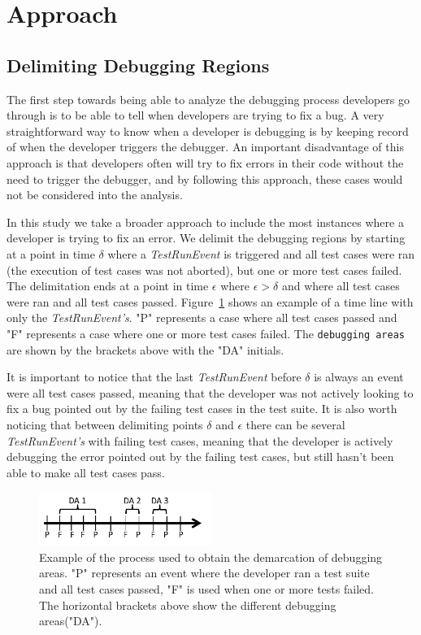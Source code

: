 \documentclass[sigconf]{acmart}
\begin{document}
\section{Approach}
\subsection{Delimiting Debugging Regions}
The first step towards being able to analyze the debugging
process developers go through is to be able to tell when
developers are trying to fix a bug. A very straightforward 
way to know when a developer is debugging is by keeping
record of when the developer triggers the debugger. An important
disadvantage of this approach is that 
developers often will try to fix errors in their code without the
need to trigger the debugger, and by following this approach,
these cases would not
be considered into the analysis.

In this study we take a broader approach to include the most 
instances where a developer is trying to fix an error.
We delimit the debugging regions by starting at a point
in time $\delta$ where a \textit{TestRunEvent} is triggered and 
all test cases were ran (the execution of test cases
was not aborted), but one or more test cases failed.
The delimitation ends at a point in time $\epsilon $ where $ \epsilon > \delta$ 
and where all test cases were ran and all test cases passed.
Figure~\ref{demarcations} shows an example of a time line
with only the \textit{TestRunEvent's}. "P" represents a case
where all test cases passed and "F" represents a case where one
or more test cases failed. The \texttt{debugging areas} are shown by
the brackets above with the "DA" initials. 


It is important to notice that the last \textit{TestRunEvent} before $\delta$ 
is always an event were all test cases passed, meaning that the
developer was not actively looking to fix a bug pointed out by the
failing test cases in the test suite. It is also worth noticing
that between delimiting points $\delta$ and $\epsilon$ there can be 
several \textit{TestRunEvent's} with failing test cases, meaning
that the developer is actively debugging the error pointed out
by the failing test cases, but still hasn't been able to make
all test cases pass.

\begin{figure}[h]
\label{demarcations}
\caption{Example of the process used to obtain the demarcation of
debugging areas. "P" 
represents an event where the developer ran a test suite and all test cases
passed, "F" is used when one or more tests failed. The horizontal brackets
above show the different debugging areas("DA").}
\centering
\includegraphics[width=0.5\textwidth]{images/demarcations.png}
\end{figure}
\end{document}
